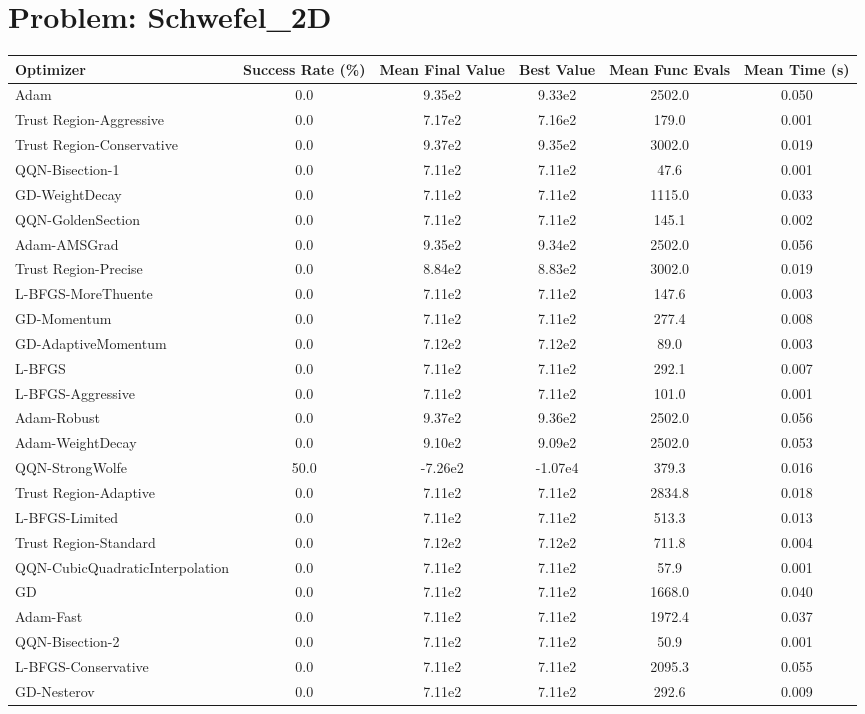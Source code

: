 \documentclass{article}
\begin{document}
\section{Problem: Schwefel\_2D}
\begin{longtable}{p{3cm}*{5}{c}}
\toprule
\textbf{Optimizer} & \textbf{Success Rate (\%)} & \textbf{Mean Final Value} & \textbf{Best Value} & \textbf{Mean Func Evals} & \textbf{Mean Time (s)} \\
\midrule
Adam & 0.0 & 9.35e2 & 9.33e2 & 2502.0 & 0.050 \\
Trust Region-Aggressive & 0.0 & 7.17e2 & 7.16e2 & 179.0 & 0.001 \\
Trust Region-Conservative & 0.0 & 9.37e2 & 9.35e2 & 3002.0 & 0.019 \\
QQN-Bisection-1 & 0.0 & 7.11e2 & 7.11e2 & 47.6 & 0.001 \\
GD-WeightDecay & 0.0 & 7.11e2 & 7.11e2 & 1115.0 & 0.033 \\
QQN-GoldenSection & 0.0 & 7.11e2 & 7.11e2 & 145.1 & 0.002 \\
Adam-AMSGrad & 0.0 & 9.35e2 & 9.34e2 & 2502.0 & 0.056 \\
Trust Region-Precise & 0.0 & 8.84e2 & 8.83e2 & 3002.0 & 0.019 \\
L-BFGS-MoreThuente & 0.0 & 7.11e2 & 7.11e2 & 147.6 & 0.003 \\
GD-Momentum & 0.0 & 7.11e2 & 7.11e2 & 277.4 & 0.008 \\
GD-AdaptiveMomentum & 0.0 & 7.12e2 & 7.12e2 & 89.0 & 0.003 \\
L-BFGS & 0.0 & 7.11e2 & 7.11e2 & 292.1 & 0.007 \\
L-BFGS-Aggressive & 0.0 & 7.11e2 & 7.11e2 & 101.0 & 0.001 \\
Adam-Robust & 0.0 & 9.37e2 & 9.36e2 & 2502.0 & 0.056 \\
Adam-WeightDecay & 0.0 & 9.10e2 & 9.09e2 & 2502.0 & 0.053 \\
QQN-StrongWolfe & 50.0 & -7.26e2 & -1.07e4 & 379.3 & 0.016 \\
Trust Region-Adaptive & 0.0 & 7.11e2 & 7.11e2 & 2834.8 & 0.018 \\
L-BFGS-Limited & 0.0 & 7.11e2 & 7.11e2 & 513.3 & 0.013 \\
Trust Region-Standard & 0.0 & 7.12e2 & 7.12e2 & 711.8 & 0.004 \\
QQN-CubicQuadraticInterpolation & 0.0 & 7.11e2 & 7.11e2 & 57.9 & 0.001 \\
GD & 0.0 & 7.11e2 & 7.11e2 & 1668.0 & 0.040 \\
Adam-Fast & 0.0 & 7.11e2 & 7.11e2 & 1972.4 & 0.037 \\
QQN-Bisection-2 & 0.0 & 7.11e2 & 7.11e2 & 50.9 & 0.001 \\
L-BFGS-Conservative & 0.0 & 7.11e2 & 7.11e2 & 2095.3 & 0.055 \\
GD-Nesterov & 0.0 & 7.11e2 & 7.11e2 & 292.6 & 0.009 \\
\bottomrule
\end{longtable}
\end{document}
